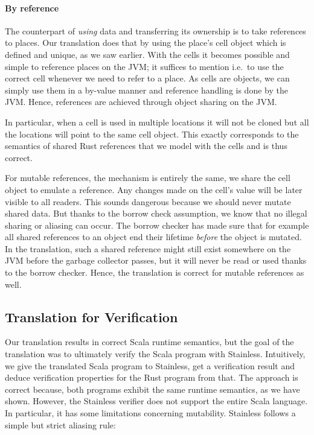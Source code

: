 \paragraph{By reference}

The counterpart of \emph{using} data and transferring its ownership is
to take references to places. Our translation does that by using the
place's cell object which is defined and unique, as we saw earlier. With
the cells it becomes possible and simple to reference places on the JVM;
it suffices to mention i.e.~to use the correct cell whenever we need to
refer to a place. As cells are objects, we can simply use them in a
by-value manner and reference handling is done by the JVM. Hence,
references are achieved through object sharing on the JVM.

In particular, when a cell is used in multiple locations it will not be
cloned but all the locations will point to the same cell object. This
exactly corresponds to the semantics of shared Rust references that we
model with the cells and is thus correct.

For mutable references, the mechanism is entirely the same, we share the
cell object to emulate a reference. Any changes made on the cell's value
will be later visible to all readers. This sounds dangerous because we
should never mutate shared data. But thanks to the borrow check
assumption, we know that no illegal sharing or aliasing can occur. The
borrow checker has made sure that for example all shared references to
an object end their lifetime \emph{before} the object is mutated. In the
translation, such a shared reference might still exist somewhere on the
JVM before the garbage collector passes, but it will never be read or
used thanks to the borrow checker. Hence, the translation is correct for
mutable references as well.

\subsection{Translation for Verification}
\label{sec:aliasing-restrictions}

Our translation results in correct Scala runtime semantics, but the goal
of the translation was to ultimately verify the Scala program with
Stainless. Intuitively, we give the translated Scala program to
Stainless, get a verification result and deduce verification properties
for the Rust program from that. The approach is correct because, both
programs exhibit the same runtime semantics, as we have shown. However,
the Stainless verifier does not support the entire Scala language. In
particular, it has some limitations concerning mutability. Stainless
follows a simple but strict aliasing rule:

